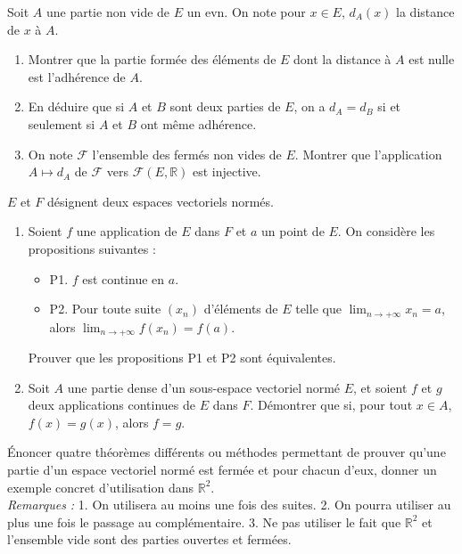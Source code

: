 \begin{exercice}
Soit $A$ une partie non vide de $E$ un evn. On note pour $x \in E$, $d_{A}(x)$ la distance de $x$ à $A$.
\begin{enumerate}
    \item Montrer que la partie formée des éléments de $E$ dont la distance à $A$ est nulle est l'adhérence de $A$.
    \item En déduire que si $A$ et $B$ sont deux parties de $E$, on a $d_{A} = d_{B}$ si et seulement si $A$ et $B$ ont même adhérence.
    \item On note $\mathcal{F}$ l'ensemble des fermés non vides de $E$. Montrer que l'application $A \mapsto d_{A}$ de $\mathcal{F}$ vers $\mathcal{F}(E, \mathbb{R})$ est injective.
\end{enumerate}
\end{exercice}

\begin{exercice}
$E$ et $F$ désignent deux espaces vectoriels normés.
\begin{enumerate}
    \item Soient $f$ une application de $E$ dans $F$ et $a$ un point de $E$. On considère les propositions suivantes :
    \begin{itemize}
        \item P1. $f$ est continue en $a$.
        \item P2. Pour toute suite $(x_{n})$ d'éléments de $E$ telle que $\lim_{n \rightarrow +\infty} x_{n} = a$, alors $\lim_{n \rightarrow +\infty} f(x_{n}) = f(a)$.
    \end{itemize}
    Prouver que les propositions P1 et P2 sont équivalentes.
    \item Soit $A$ une partie dense d'un sous-espace vectoriel normé $E$, et soient $f$ et $g$ deux applications continues de $E$ dans $F$. Démontrer que si, pour tout $x \in A$, $f(x)=g(x)$, alors $f=g$.
\end{enumerate}
\end{exercice}

\begin{exercice}
Énoncer quatre théorèmes différents ou méthodes permettant de prouver qu'une partie d'un espace vectoriel normé est fermée et pour chacun d'eux, donner un exemple concret d'utilisation dans $\mathbb{R}^{2}$. \\

\textit{Remarques :}
1. On utilisera au moins une fois des suites.
2. On pourra utiliser au plus une fois le passage au complémentaire.
3. Ne pas utiliser le fait que $\mathbb{R}^{2}$ et l'ensemble vide sont des parties ouvertes et fermées.
\end{exercice}

